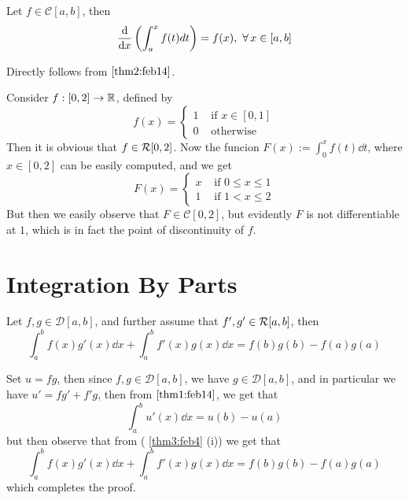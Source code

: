 \begin{corr}\label{cor1:feb14}
    Let $f \in \mathcal{C}[a,b]$, then 
    \[
        \dv{x} \left( \int_a^x f(t)dt \right) = f(x), \ \forall \, x \in [a,b]    
    \]
\end{corr}
\begin{prf}
    Directly follows from  $\ref{thm2:feb14}$.
\end{prf}

\begin{example}\label{eg3:feb14}
    Consider $f : [0,2] \to \mathbb{R}$, defined by 
    \[
        f(x) = \begin{cases}
            1 & \mbox{ if } x \in [0,1] \\ 
            0 & \mbox{ otherwise}
        \end{cases}  
    \]
    Then it is obvious that $f \in \mathcal{R}[0,2]$. Now the funcion $F(x) := \int_0^x f(t) \dd{t}$, where $x \in [0,2]$ can be easily computed, and we get 
    \[
        F(x) = \begin{cases}
            x & \mbox{ if } 0 \leq x \leq 1 \\ 
            1 & \mbox{ if } 1 < x \leq 2
        \end{cases}  
    \]
    But then we easily observe that $F \in \mathcal{C}[0,2]$, but evidently $F$ is not differentiable at $1$, which is in fact the point of discontinuity of $f$.
\end{example}

\section{Integration By Parts}

\begin{thm}\label{thm3:feb14} 
    Let $f, g \in \mathcal{D}[a,b]$, and further assume that $f', g' \in \mathcal{R}[a,b]$, then 
    \begin{equation}\label{ibp}
        \int_a^b f(x)g'(x) \dd{x} + \int_a^b f'(x)g(x) \dd{x} = f(b)g(b) - f(a)g(a)
    \end{equation}
\end{thm}

\begin{prf}
    Set $u = fg$, then since $f,g \in \mathcal{D}[a,b]$, we have $g \in \mathcal{D}[a,b]$, and in particular we have $u' = fg'+f'g$, then from  $\ref{thm1:feb14}$, we get that 
    \[
         \int_a^b u'(x) \dd{x} = u(b) - u(a)   
    \]
    but then observe that from  ( \ref{thm3:feb4} (i)) we get that 
    \[
        \int_a^b f(x)g'(x) \dd{x} + \int_a^b f'(x)g(x) \dd{x} = f(b)g(b) - f(a)g(a)  
    \]
    which completes the proof.
\end{prf}

